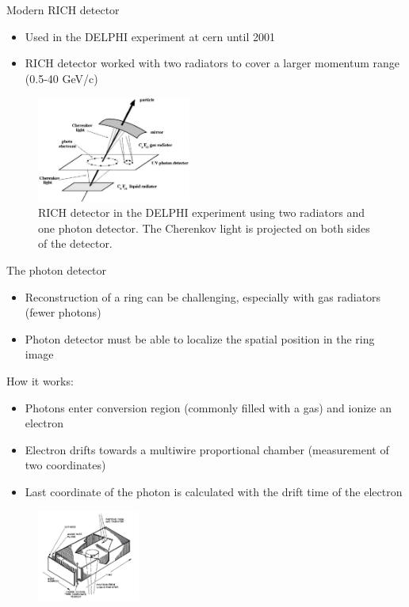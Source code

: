 \documentclass[aspectratio=1610, 10pt]{beamer}
\begin{document}
\begin{frame}{Modern RICH detector}
  \begin{itemize}
    \item Used in the DELPHI experiment at cern until 2001
    \medskip
    \item RICH detector worked with two radiators to cover a larger momentum range (0.5-40 GeV/c)
  \end{itemize}
  \begin{figure}
    \includegraphics[width=0.45\textwidth]{images/rich_delphi.png}
    \caption{RICH detector in the DELPHI experiment using two radiators and one photon detector. The Cherenkov light is projected on both
    sides of the detector.}
  \end{figure}
\end{frame}

\begin{frame}{The photon detector}
  \begin{itemize}
    \item Reconstruction of a ring can be challenging, especially with gas radiators (fewer photons)
    \medskip
    \item Photon detector must be able to localize the spatial position in the ring image
  \end{itemize}
How it works:
\begin{itemize}
  \item Photons enter conversion region (commonly filled with a gas) and ionize an electron
  \medskip
  \item Electron drifts towards a multiwire proportional chamber (measurement of two coordinates)
  \medskip
  \item Last coordinate of the photon is calculated with the drift time of the electron
\end{itemize}
  \begin{figure}
    \includegraphics[width=0.3\textwidth]{images/photon_det.png}
  \end{figure}
\end{frame}
\end{document}
